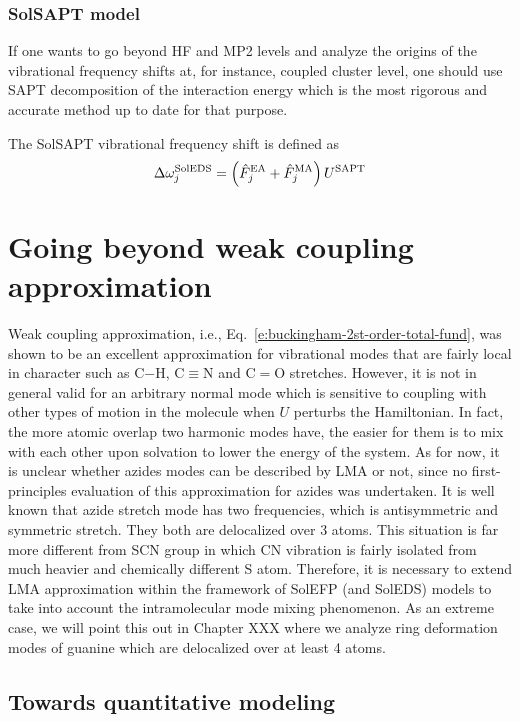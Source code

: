 \documentclass[a4paper,titlepage,twoside,fleqn,12pt]{book}
\begin{document}
\begin{refsection}
\subsubsection{SolSAPT model}

If one wants to go beyond HF and MP2 levels and
analyze the origins of the vibrational frequency 
shifts at, for instance, coupled cluster
level, one should use SAPT decomposition of the interaction
energy which is
the most rigorous and accurate method up to date for that purpose.

The SolSAPT vibrational frequency shift is defined as
%
\begin{equation}
 \Delta\omega_j^{\rm SolEDS} = \left(\hat{F}_j^{\rm EA} + \hat{F}_j^{\rm MA}\right) U^{\rm SAPT} 
\end{equation}
%

\section{Going beyond weak coupling approximation}

Weak coupling approximation, i.e., Eq.~\eqref{e:buckingham-2st-order-total-fund},
was shown to be an excellent approximation
for vibrational modes that are fairly local in character
such as C$-$H, C$\equiv$N and C$=$O stretches. However, it
is not in general valid for an arbitrary normal mode
which is sensitive to coupling with other types of motion
in the molecule when $U$ perturbs the Hamiltonian.
In fact, the more atomic overlap two harmonic modes have,
the easier for them is to mix with each other
upon solvation to lower the energy
of the system. As for now, it is unclear whether azides modes
can be described by LMA or not, since no first\hyp{}principles
evaluation of this approximation for azides was undertaken.
It is well known that azide stretch mode has two frequencies,
which is antisymmetric and symmetric stretch. They both
are delocalized over 3 atoms. This situation is far more different
from SCN group in which CN vibration is fairly isolated
from much heavier and chemically different S atom.
Therefore, it is necessary to extend LMA approximation
within the framework of SolEFP (and SolEDS) models
to take into account the intramolecular mode mixing
phenomenon. As an extreme case, we will point this out
in Chapter XXX where we analyze ring deformation modes
of guanine which are delocalized over at least 4 atoms.

\subsection{Towards quantitative modeling}


\end{refsection}
\end{document}
